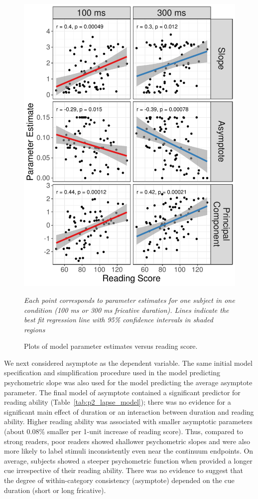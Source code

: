 \documentclass[../uwthesis.tex]{subfiles}
\begin{document}
\begin{figure}
    \centering
    \includegraphics[width=14cm]{images/paper_2/figure_param_relationships.pdf}
    \caption{Plots of model parameter estimates versus reading score.}
    \label{fig:p2_fig1}
    \item \textit{Each point corresponds to parameter estimates for one subject in one condition (100 ms or 300 ms fricative duration). Lines indicate the best fit regression line with 95\% confidence intervals in shaded regions}
\end{figure}

We next considered asymptote as the dependent variable. The same initial model specification and simplification procedure used in the model predicting psychometric slope was also used for the model predicting the average asymptote parameter. The final model of asymptote contained a significant predictor for reading ability (Table~\ref{tab:p2_lapse_model}); there was no evidence for a significant main effect of duration or an interaction between duration and reading ability. Higher reading ability was associated with smaller asymptotic parameters (about 0.08\% smaller per 1-unit increase of reading score). Thus, compared to strong readers, poor readers showed shallower psychometric slopes and were also more likely to label stimuli inconsistently even near the continuum endpoints. On average, subjects showed a steeper psychometric function when provided a longer cue irrespective of their reading ability. There was no evidence to suggest that the degree of within-category consistency (asymptote) depended on the cue duration (short or long fricative).
\end{document}
